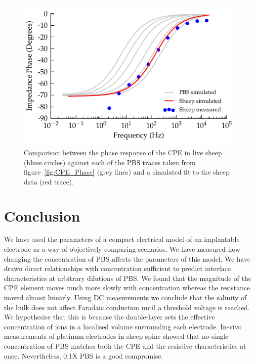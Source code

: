 \documentclass[journal, a4paper]{IEEEtran}
\begin{document}
{\begin{figure}
    \begin{center}
        \includegraphics{graphics/displacement-withSheep_impedanceVsFrequency_phase}
    \end{center}
    \caption{Comparison between the phase response of the CPE in live sheep (blues circles) against each of the PBS traces taken from figure~\ref{fig:CPE_Phase} (grey lines) and a simulated fit to the sheep data (red trace).}
    \label{fig:displacement_sheepCPEPhase}
\end{figure}

\section{Conclusion}

We have used the parameters of a compact electrical model of an implantable electrode as a way of objectively comparing scenarios.
We have measured how changing the concentration of PBS affects the parameters of this model.
We have drawn direct relationships with concentration sufficient to predict interface characteristics at arbitrary dilutions of PBS.
We found that the magnitude of the CPE element moves much more slowly with concentration whereas the resistance moved almost linearly.
Using DC measurements we conclude that the salinity of the bulk does not affect Faradaic conduction until a threshold voltage is reached. We hypothesise that this is because the double-layer sets the effective concentration of ions in a localised volume surrounding each electrode. In-vivo measurements of platinum electrodes in sheep spine showed that no single concentration of PBS matches both the CPE and the resistive characteristics at once. Nevertheless, 0.1X PBS is a good compromise.

}
\end{document}

